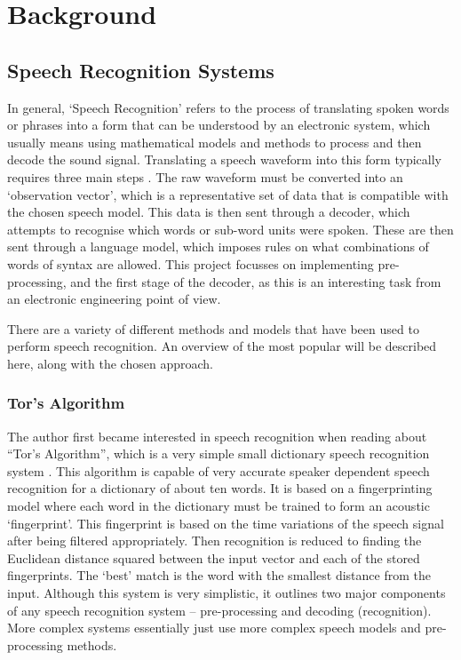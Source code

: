 \chapter{Background} %
\label{cha:background}


\section{Speech Recognition Systems} %
\label{sec:speech_recognition_systems}
	In general, `Speech Recognition' refers to the process of translating spoken words or phrases into a form that can be understood by an electronic system, which usually means using mathematical models and methods to process and then decode the sound signal.  Translating a speech waveform into this form typically requires three main steps \cite{melnikoff2003speech}.  The raw waveform must be converted into an `observation vector', which is a representative set of data that is compatible with the chosen speech model.  This data is then sent through a decoder, which attempts to recognise which words or sub-word units were spoken.  These are then sent through a language model, which imposes rules on what combinations of words of syntax are allowed.  This project focusses on implementing pre-processing, and the first stage of the decoder, as this is an interesting task from an electronic engineering point of view.

	There are a variety of different methods and models that have been used to perform speech recognition.  An overview of the most popular will be described here, along with the chosen approach.

	\subsection{Tor's Algorithm} %
	\label{sub:tors_algorithm}
		The author first became interested in speech recognition when reading about ``Tor's Algorithm'', which is a very simple small dictionary speech recognition system \cite{tor2003}.  This algorithm is capable of very accurate speaker dependent speech recognition for a dictionary of about ten words.  It is based on a fingerprinting model where each word in the dictionary must be trained to form an acoustic `fingerprint'.  This fingerprint is based on the time variations of the speech signal after being filtered appropriately.  Then recognition is reduced to finding the Euclidean distance squared between the input vector and each of the stored fingerprints.  The `best' match is the word with the smallest distance from the input.
		Although this system is very simplistic, it outlines two major components of any speech recognition system -- pre-processing and decoding (recognition).  More complex systems essentially just use more complex speech models and pre-processing methods.

